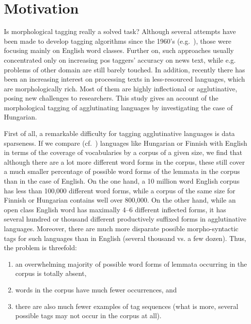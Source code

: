 \section{Motivation}

Is morphological tagging really a solved task? 
Although several attempts have been made to develop tagging algorithms since the 1960’s (e.g.~\cite{Stolz1965,Klein1963}), those were focusing mainly on English word classes. 
Further on, such approaches usually concentrated only on increasing \gls{pos} taggers’ accuracy on news text, while e.g. problems of other domain are still barely touched. 
In addition, recently there has been an increasing interest on processing texts in less-resourced languages, which are morphologically rich. 
Most of them are highly inflectional or agglutinative, posing new challenges to researchers. This study gives an account of the morphological tagging of agglutinating languages by investigating the case of Hungarian. 

First of all, a remarkable difficulty for tagging agglutinative languages is data sparseness. If we compare (cf.~\cite{Oravecz2002a}) languages like Hungarian or Finnish with English in terms of the coverage of vocabularies by a corpus of a given size, we find that although there are a lot more different word forms in the corpus, these still cover a much smaller percentage of possible word forms of the lemmata in the corpus than in the case of English. 
On the one hand, a 10 million word English corpus has less than 100,000 different word forms, while a corpus of the same size for Finnish or Hungarian contains well over 800,000. On the other hand, while an open class English word has maximally 4--6 different inflected forms, it has several hundred or thousand different productively suffixed forms in agglutinative languages. Moreover, there are much more disparate possible morpho-syntactic tags for such languages than in English (several thousand vs. a few dozen). 
Thus, the problem is threefold:
\begin{enumerate}
  \item an overwhelming majority of possible word forms of lemmata occurring in the corpus is totally absent,
  \item words in the corpus have much fewer occurrences, and
  \item there are also much fewer examples of tag sequences (what is more, several possible tags may not occur in the corpus at all).
\end{enumerate}

